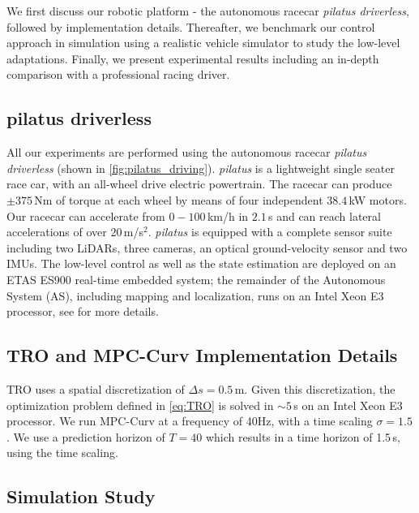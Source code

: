 
We first discuss our robotic platform - the autonomous racecar \emph{pilatus driverless}, followed by implementation details. Thereafter, we benchmark our control approach in simulation using a realistic vehicle simulator to study the low-level adaptations. Finally, we present experimental results including an in-depth comparison with a professional racing driver. 

\subsection{pilatus driverless}
\label{sec:car_specs}
All our experiments are performed using the autonomous racecar \emph{pilatus driverless} (shown in \cref{fig:pilatus_driving}). \emph{pilatus} is a lightweight single seater race car, with an all-wheel drive electric powertrain. The racecar can produce $\pm375$\,Nm of torque at each wheel by means of four independent $38.4$\,kW motors. Our racecar can accelerate from $0-100$\,km/h in $2.1$\,s and can reach lateral accelerations of over 20\,m/s$^2$. \emph{pilatus} is equipped with a complete sensor suite including two LiDARs, three cameras, an optical ground-velocity sensor and two IMUs. The low-level control as well as the state estimation are deployed on an ETAS ES900 real-time embedded system; the remainder of the Autonomous System (AS), including mapping and localization, runs on an Intel Xeon E3 processor, see \cite{valls2018design,gosala2019redundant,Kabzan2019_AMZ,srinivasan2020end,andresen2020accurate} for more details. 

\subsection{TRO and MPC-Curv Implementation Details} \label{sec:TRO_imp}
TRO uses a spatial discretization of $\Delta s = 0.5$\,m. Given this discretization, the optimization problem defined in \eqref{eq:TRO} is solved in $\sim 5$\,s on an Intel Xeon E3 processor. We run MPC-Curv at a frequency of 40Hz, with a time scaling $\sigma = 1.5$. We use a prediction horizon of $T=40$ which results in a time horizon of 1.5\,s, using the time scaling. 

\subsection{Simulation Study}
\label{sec:results_sim}

